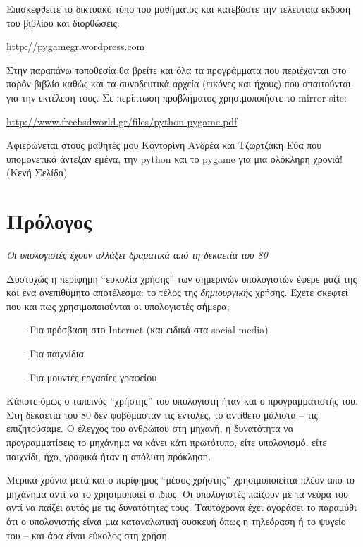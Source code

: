 \bigskip
Επισκεφθείτε το δικτυακό τόπο του μαθήματος
και κατεβάστε την τελευταία έκδοση του βιβλίου και διορθώσεις:

\bigskip
\begin{center}
\url{http://pygamegr.wordpress.com}
\end{center}
Στην παραπάνω τοποθεσία θα βρείτε και όλα τα προγράμματα που περιέχονται στο
παρόν βιβλίο καθώς και τα συνοδευτικά αρχεία (εικόνες και ήχους) που απαιτούνται
για την εκτέλεση τους.
\bigskip
Σε περίπτωση προβλήματος χρησιμοποιήστε το mirror site:
\bigskip
\begin{center}
\url{http://www.freebsdworld.gr/files/python-pygame.pdf}
\end{center}
\newpage
\vspace*{0.8in}
Αφιερώνεται στους μαθητές μου Κοντορίνη Ανδρέα και Τζωρτζάκη Εύα που
υπομονετικά άντεξαν εμένα, την python και το pygame για μια ολόκληρη χρονιά!
\newpage
(Κενή Σελίδα)
\newpage
\section*{Πρόλογος}
{\em Οι υπολογιστές έχουν αλλάξει δραματικά από τη δεκαετία του 80}

Δυστυχώς η περίφημη ``ευκολία χρήσης'' των σημερινών υπολογιστών έφερε μαζί της και ένα ανεπιθύμητο αποτέλεσμα: το τέλος της {\em δημιουργικής} χρήσης. Έχετε σκεφτεί που και πως χρησιμοποιούνται οι υπολογιστές σήμερα;
%
\begin{itemize}
\item[-] Για πρόσβαση στο Internet (και ειδικά στα social media)
\item[-] Για παιχνίδια
\item[-] Για μουντές εργασίες γραφείου
\end{itemize}
%
Κάποτε όμως ο ταπεινός ``χρήστης'' του υπολογιστή ήταν και ο προγραμματιστής
του. Στη δεκαετία του 80 δεν φοβόμασταν τις εντολές, το αντίθετο μάλιστα --
τις επιζητούσαμε.  Ο έλεγχος του ανθρώπου στη μηχανή, η δυνατότητα να
προγραμματίσεις το μηχάνημα να κάνει κάτι πρωτότυπο, είτε υπολογισμό, είτε παιχνίδι, ήχο, γραφικά ήταν η απόλυτη πρόκληση.

Μερικά χρόνια μετά και ο περίφημος ``μέσος χρήστης'' χρησιμοποιείται πλέον
από το μηχάνημα αντί να το χρησιμοποιεί ο ίδιος. Οι υπολογιστές παίζουν
με τα νεύρα του αντί να παίζει αυτός με τις δυνατότητες τους.
Ταυτόχρονα έχει αγοράσει το παραμύθι ότι ο υπολογιστής είναι μια
καταναλωτική συσκευή όπως η τηλεόραση ή το ψυγείο του -- και άρα είναι
εύκολος στη χρήση.

